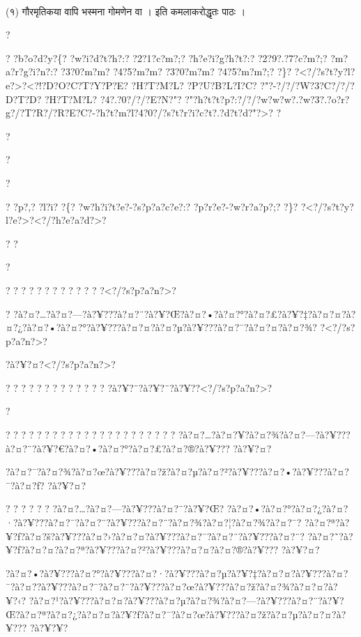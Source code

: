 \documentclass[11pt, openany]{book}
\begin{document}
{{{{{{{{{{{{{{{{{{{{%

{\\
(१) गौरमृतिकया वापि भस्मना गोमणेन वा । इति कमलाकरोद्धृतः पाठः ।

?

? ?b?o?d?y?\{? ?w?i?d?t?h?:? ?2?1?c?m?;? ?h?e?i?g?h?t?:? ?2?9?.?7?c?m?;?
?m?a?r?g?i?n?:? ?3?0?m?m? ?4?5?m?m? ?3?0?m?m? ?4?5?m?m?;? ?\}?
?\textless{}?/?s?t?y?l?e?\textgreater{}?\textless{}?!?D?O?C?T?Y?P?E?
?H?T?M?L? ?P?U?B?L?I?C? ?"?-?/?/?W?3?C?/?/?D?T?D? ?H?T?M?L?
?4?.?0?/?/?E?N?"?
?"?h?t?t?p?:?/?/?w?w?w?.?w?3?.?o?r?g?/?T?R?/?R?E?C?-?h?t?m?l?4?0?/?s?t?r?i?c?t?.?d?t?d?"?\textgreater{}?
?

?

?

?

? ?p?,? ?l?i? ?\{? ?w?h?i?t?e?-?s?p?a?c?e?:? ?p?r?e?-?w?r?a?p?;? ?\}?
?\textless{}?/?s?t?y?l?e?\textgreater{}?\textless{}?/?h?e?a?d?\textgreater{}?

? ?

?

? ? ? ? ? ? ? ? ? ? ? ? ?\textless{}?/?s?p?a?n?\textgreater{}?

?
?à?¤?\ldots{}?à?¤?---?à?¥???à?¤?¨?à?¥?Œ?à?¤?•?à?¤?°?à?¤?£?à?¥?‡?à?¤?¤?à?¤?¿?à?¤?•?à?¤?°?à?¥???à?¤?¤?à?¤?µ?à?¥???à?¤?¯?à?¤?¤?à?¤?¾?
?\textless{}?/?s?p?a?n?\textgreater{}?

?à?¥?¤?\textless{}?/?s?p?a?n?\textgreater{}?

? ? ? ? ? ? ? ? ? ? ? ? ?
?à?¥?¨?à?¥?¨?à?¥?­?\textless{}?/?s?p?a?n?\textgreater{}?

?

? ? ? ? ? ? ? ? ? ? ? ? ? ? ? ? ? ? ? ? ? ?
?à?¤?\ldots{}?à?¤?¥?à?¤?¾?à?¤?---?à?¥???à?¤?¨?à?¥?€?à?¤?•?à?¤?°?à?¤?£?à?¤?®?à?¥???
?à?¥?¤?

?à?¤?¯?à?¤?¾?à?¤?œ?à?¥???à?¤?ž?à?¤?µ?à?¤?²?à?¥???à?¤?•?à?¥???à?¤?¯?à?¤?ƒ?
?à?¥?¤?

? ? ? ? ? ? ?à?¤?\ldots{}?à?¤?---?à?¥???à?¤?¨?à?¥?Œ?
?à?¤?•?à?¤?°?à?¤?¿?à?¤?·?à?¥???à?¤?¯?à?¤?¨?à?¥???à?¤?¨?à?¤?¾?à?¤?¦?à?¤?¾?à?¤?¯?
?à?¤?ª?à?¥?ƒ?à?¤?š?à?¥???à?¤?›?à?¤?¤?à?¥???à?¤?¯?à?¤?¨?à?¥???à?¤?¨?
?à?¤?˜?à?¥?ƒ?à?¤?¤?à?¤?ª?à?¥???à?¤?²?à?¥???à?¤?¤?à?¤?®?à?¥??? ?à?¥?¤?

?à?¤?•?à?¥???à?¤?°?à?¥???à?¤?·?à?¥???à?¤?µ?à?¥?‡?à?¤?¤?à?¥???à?¤?¯?à?¤?­?à?¥???à?¤?¯?à?¤?¨?à?¥???à?¤?œ?à?¥???à?¤?ž?à?¤?¾?à?¤?¤?à?¥?‹?
?à?¤?¹?à?¥???à?¤?¤?à?¥???à?¤?µ?à?¤?¾?à?¤?---?à?¥???à?¤?¨?à?¥?Œ?à?¤?ª?à?¤?¿?à?¤?¤?à?¥?ƒ?à?¤?¯?à?¤?œ?à?¥???à?¤?ž?à?¤?µ?à?¤?¤?à?¥???
?à?¥?¥?

}}}}}}}}}}}}}}}}}}}}}
\end{document}
